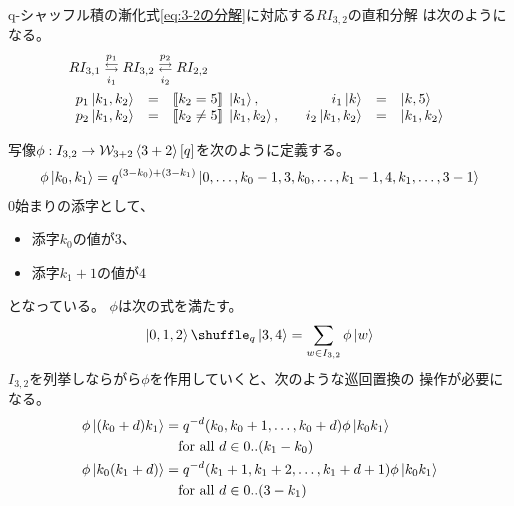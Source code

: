 {	q-シャッフル積の漸化式\eqref{eq:3-2の分解}に対応する$RI_{3,2}$の直和分解
	は次のようになる。
	\begin{equation*}\begin{split}
		& RI_{3,1} \overset{p_1}{\underset{i_1}{\leftrightarrows}} RI_{3,2}
			\overset{p_2}{\underset{i_2}{\rightleftarrows}} RI_{2,2} \\
		& \begin{array}{rclrcl}
			p_1\mathinner{|{k_1,k_2}\rangle} &=& [\![k_2=5]\!]\;\mathinner{|{k_1}\rangle}
				,\quad & i_1\mathinner{|{k}\rangle} &=& \mathinner{|{k,5}\rangle} \\
			p_2\mathinner{|{k_1,k_2}\rangle} &=& [\![k_2\neq5]\!]\;\mathinner{|{k_1,k_2}\rangle}
				,\quad & i_2\mathinner{|{k_1,k_2}\rangle} &=& \mathinner{|{k_1,k_2}\rangle} \\
		\end{array}
	\end{split}\end{equation*}

	写像$\phi:I_{3,2}\to{\ensuremath{{\mathcal{W}}}}_{3+2}\mathinner{\langle{3+2}\rangle}[q]$を次のように定義する。
	\begin{equation*}\begin{split}
		\phi\mathinner{|{k_0,k_1}\rangle} = q^{(3-k_0)+(3-k_1)}
			\mathinner{|{0,\dots,k_0 - 1, 3, k_0,\dots,k_1 - 1, 4, k_1,\dots,3-1}\rangle}
	\end{split}\end{equation*}
	$0$始まりの添字として、
	\begin{itemize}\setlength{\itemsep}{-1mm} %
		\item 添字$k_0$の値が$3$、
		\item 添字$k_1+1$の値が$4$
	\end{itemize} %
	となっている。
	$\phi$は次の式を満たす。
	\begin{equation*}\begin{split}
		\ket{0,1,2}\shuffle_q\ket{3,4} = \sum_{w\in I_{3,2}}\phi\ket{w}
	\end{split}\end{equation*}
	$I_{3,2}$を列挙しならがら$\phi$を作用していくと、次のような巡回置換の
	操作が必要になる。
	\begin{equation*}\begin{split}
		\phi\mathinner{|{(k_0+d)k_1}\rangle} &= q^{-d} 
			(k_0, k_0 + 1, \dots, k_0 + d) \phi\mathinner{|{k_0k_1}\rangle} \\
		& \quad\text{for all } d\in0..(k_1-k_0) \\
		\phi\mathinner{|{k_0(k_1+d)}\rangle} &= q^{-d}
			(k_1 + 1, k_1 + 2, \dots, k_1 + d + 1) \phi\mathinner{|{k_0k_1}\rangle} \\
		& \quad\text{for all } d\in0..(3-k_1) \\
	\end{split}\end{equation*}

}
